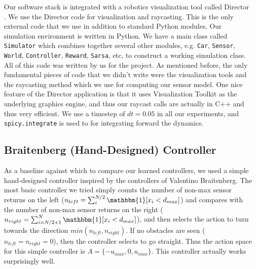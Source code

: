 \documentclass{article}
\def\code#1{\texttt{#1}}
\begin{document}
Our software stack is integrated with a robotics visualization tool called Director . We use the Director code for visualization and raycasting. This is the only external code that we use in addition to standard Python modules. Our simulation environment is written in Python. We have a main class called \code{Simulator} which combines together several other modules, e.g. \code{Car}, \code{Sensor}, \code{World}, \code{Controller}, \code{Reward}, \code{Sarsa}, etc, to construct a working simulation class. All of this code was written by us for the project. As mentioned before, the only fundamental pieces of code that we didn't write were the visualization tools and the raycasting method which we use for computing our sensor model. One nice feature of the Director application is that it uses Visualization Toolkit as the underlying graphics engine, and thus our raycast calls are actually in C++ and thus very efficient. We use a timestep of $dt = 0.05$ in all our experiments, and \code{spicy.integrate} is used to for integrating forward the dynamics.

\subsection{Braitenberg (Hand-Designed) Controller}
\label{default_controller}
As a baseline against which to compare our learned controllers, we used a simple hand-designed controller inspired by the controllers of Valentino Braitenberg.  The most basic controller we tried simply counts the number of non-max sensor returns on the left ($n_{left} = \sum_i^{N/2} \mathbbm{1}[x_i < d_{max}]$) and compares with the number of non-max sensor returns on the right ($n_{right} = \sum_{i=N/2+1}^N \mathbbm{1}[x_i < d_{max}]$), and then selects the action to turn towards the direction $min(n_{left}, n_{right})$.  If no obstacles are seen ($n_{left} = n_{right} = 0$), then the controller selects to go straight.  Thus the action space for this simple controller is $A = \{-u_{max}, 0, u_{max} \}$.  This controller actually works surprisingly well.
\end{document}
